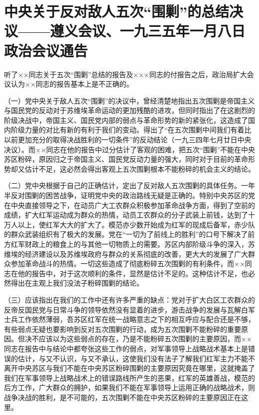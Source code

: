 \section[中央关于反对敌人五次“围剿”的总结决议——遵义会议、一九三五年一月八日政治会议通告]{中央关于反对敌人五次“围剿”的总结决议——遵义会议、一九三五年一月八日政治会议通告}


听了××同志关于五次“围剿”总结的报告及×××同志的付报告之后，政治局扩大会议认为××同志的报告基本上是不正确的。

（一）党中央关于敌人五次“围剿”的决议中，曾经清楚地指出五次围剿是帝国主义与国民党的反动对于苏维埃革命运动的更加残酷的进攻，但同时指出了在这剧烈的阶级决战中，帝国主义、国民党内部的弱点与革命形势的新的紧张化，这造成了国内阶级力量的对比有新的有利于我们的变动。得出了“在五次围剿中间我们有着比以前更加充分的取得决战胜利的一切条件”的反动结论（一九三四年七月廿日中央决议）。而××同志在他的报告中过分估计了客观的困难，把五次“围剿”不能在中央苏区粉碎，原因归之于帝国主义、国民党反动力量的强大，同时对于目前的革命形势却又估计不足，这必然会得出客观上五次围剿根本不能粉碎的机会主义的结论。

（二）党中央根据于自己的正确估计，定出了反对敌人五次围剿的具体任务。一年半反对围剿的困苦战争，证明党中央的政治路线无疑是正确的。特别中央苏区的党在中央直接领导之下，在动员广大工农群众积极参加革命战争方面，得到了空前的成绩，扩大红军运动成为群众的热情，动员工农群众的分子武装上前钱，达到了十万人以上，使红军大大的扩大了。模范亦少数开始成为红军的现成后备军，赤少队的群众武装组织有了极大的发展。党在“一切为了前线上的胜利”的口号下解决了前方红军财政上的粮食上的与其他一切物质上的需要。苏区内部阶级斗争的深入，苏维埃的经济建设以及苏维埃政府与群众的关系彻底的改善，更大大的发展了广大群众参加革命战斗的热情。一切这些造成了彻底粉碎五次围剿的有利条件，而××同志在他的报告中，对于这次顺利的条件，显然是估计不足的。这种估计不足，也必然得出在主观上我们没法子粉碎围剿的结论。

（三）应该指出在我们的工作中还有许多严重的缺点：党对于扩大白区工农群众的反帝反国民党与日常斗争的领导依然没有显着的进步，游击战争的发展与瓦解白军士兵工作依然薄弱，吾苏区红军在统一战略意志之下的相互呼应与配合还是不够，有些弱点无疑也要影响到反对五次围剿的行动，成为五次围剿不能粉碎的重要原因。但决不应该以为这些弱点的存在，乃是不能粉碎五次围剿的主要原因，而××同志在报告中与结论中都夸张这些工作的弱点，对军事领导上战略战术基本上是错误的估计，与又不认识，与又不承认，这使我们没有法子了解我们红军主力不能不离开中央苏区与我们不能在中央苏区粉碎围剿的主要原因究竟在哪里，这就掩盖了我们在军事领导上战略战术上的错误路线所产生的恶果，红军的英雄善战，模范的后方工作，广大群众的拥护，如果我们不能在军事领导上运用正确的战略战术，则战争决战的胜利，是不可能的，五次围剿不能在中央苏区粉碎的主要原因正在这里。

